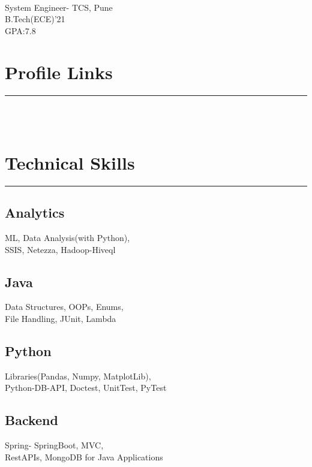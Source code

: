 \documentclass[]{DD_Resume_21}
\begin{document}
%
%

\begin{minipage}[t]{0.33\textwidth} 
\begin{large}
	\\
\end{large}
System Engineer- TCS, Pune\\
B.Tech(ECE)'21\\
GPA:7.8
\section{Profile Links} 
\noindent\rule{5cm}{0.4pt}\\
\href{https://linkedin.com/in/debadrita-debnath-22802580}{}\\
\href{https://github.com/Debadrita1517}{}
\section{Technical Skills}
\noindent\rule{5cm}{0.4pt}
\subsection{Analytics}
ML, Data Analysis(with Python),\\
SSIS, Netezza, Hadoop-Hiveql
\vspace{6pt}
\subsection{Java}
Data Structures, OOPs, Enums,\\
File Handling, JUnit, Lambda
\vspace{6pt}
\subsection{Python}
Libraries(Pandas, Numpy, MatplotLib),\\
Python-DB-API, Doctest, UnitTest, PyTest
\vspace{6pt}
\subsection{Backend}
Spring- SpringBoot, MVC,\\
RestAPIs, MongoDB for Java Applications
\vspace{6pt}

\end{minipage}
\end{document}
